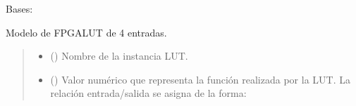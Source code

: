 \documentclass[letterpaper,10pt,english]{sphinxmanual}
\begin{document}
\begin{fulllineitems}
\label{\detokenize{fpga:fpga.Lut4}}
\pysigstartsignatures
{}
\pysigstopsignatures
\sphinxAtStartPar
Bases: 

\sphinxAtStartPar
Modelo de FPGA\sphinxhyphen{}LUT de 4 entradas.
\begin{quote}\begin{description}
\begin{itemize}
\item {} 
\sphinxAtStartPar
{} () \textendash{} Nombre de la instancia LUT.

\item {} 
\sphinxAtStartPar
{} () \textendash{} 
\sphinxAtStartPar
Valor numérico que representa la función realizada por la LUT. La relación entrada/salida se asigna de la forma:



\end{itemize}
\end{description}
\end{quote}
\end{fulllineitems}
\end{document}
